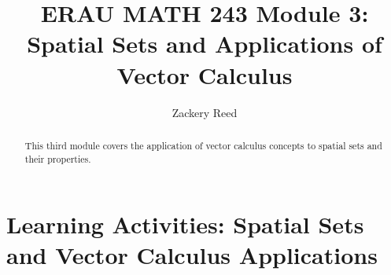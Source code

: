 \documentclass{xourse}
\title{ERAU MATH 243 Module 3: Spatial Sets and Applications of Vector Calculus}
\author{Zackery Reed}
\begin{document}
\begin{abstract}
This third module covers the application of vector calculus concepts to spatial sets and their properties.
\end{abstract}
\maketitle

\part{Learning Activities: Spatial Sets and Vector Calculus Applications}
\sectionstyle


\end{document}
